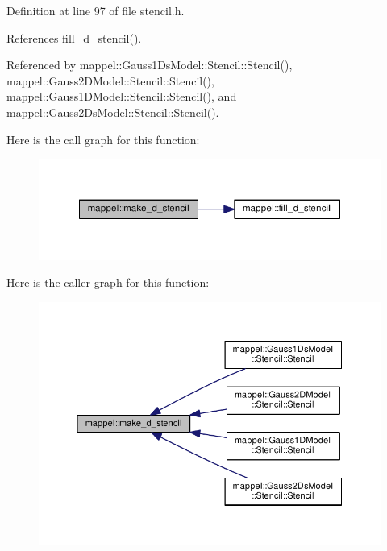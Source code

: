 Definition at line 97 of file stencil.\+h.



References fill\+\_\+d\+\_\+stencil().



Referenced by mappel\+::\+Gauss1\+Ds\+Model\+::\+Stencil\+::\+Stencil(), mappel\+::\+Gauss2\+D\+Model\+::\+Stencil\+::\+Stencil(), mappel\+::\+Gauss1\+D\+Model\+::\+Stencil\+::\+Stencil(), and mappel\+::\+Gauss2\+Ds\+Model\+::\+Stencil\+::\+Stencil().



Here is the call graph for this function\+:\nopagebreak
\begin{figure}[H]
\begin{center}
\leavevmode
\includegraphics[width=335pt]{namespacemappel_ac9d449b0121b33962da2c9c13cbb593c_cgraph}
\end{center}
\end{figure}




Here is the caller graph for this function\+:\nopagebreak
\begin{figure}[H]
\begin{center}
\leavevmode
\includegraphics[width=350pt]{namespacemappel_ac9d449b0121b33962da2c9c13cbb593c_icgraph}
\end{center}
\end{figure}


